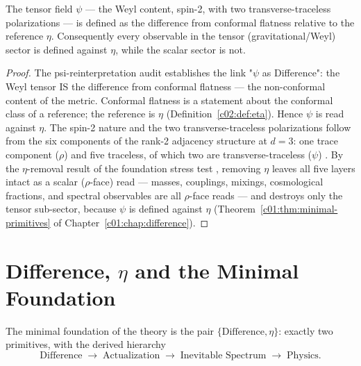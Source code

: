 \begin{theorem}
\label{c02:thm:tensor-read}
The tensor field $\psi$ --- the Weyl content, spin-2, with two transverse-traceless
polarizations --- is defined as the difference from conformal flatness relative to the
reference $\eta$. Consequently every observable in the tensor (gravitational/Weyl) sector is
defined against $\eta$, while the scalar sector is not.
\end{theorem}

\begin{proof}
The psi-reinterpretation audit \cite{c02:QG285} establishes the link "$\psi$ as Difference": the
Weyl tensor IS the difference from conformal flatness --- the non-conformal content of the
metric. Conformal flatness is a statement about the conformal class of a reference; the
reference is $\eta$ (Definition~\ref{c02:def:eta}). Hence $\psi$ is read against $\eta$. The
spin-2 nature and the two transverse-traceless polarizations follow from the six components
of the rank-2 adjacency structure at $d=3$: one trace component ($\rho$) and five traceless,
of which two are transverse-traceless ($\psi$) \cite{c02:QG286}. By the $\eta$-removal result
of the foundation stress test \cite{c02:QG292}, removing $\eta$ leaves all five layers intact
as a scalar ($\rho$-face) read --- masses, couplings, mixings, cosmological fractions, and
spectral observables are all $\rho$-face reads --- and destroys only the tensor sub-sector,
because $\psi$ is defined against $\eta$ (Theorem~\ref{c01:thm:minimal-primitives} of
Chapter~\ref{c01:chap:difference}).
\end{proof}

\section{Difference, \texorpdfstring{$\eta$}{eta} and the Minimal Foundation}
\label{c02:sec:minimal-foundation}

\begin{theorem}
\label{c02:thm:minimal-foundation}
The minimal foundation of the theory is the pair $\{\text{Difference},\eta\}$: exactly two
primitives, with the derived hierarchy
\begin{equation}
\label{c02:eq:core}
\text{Difference}\;\longrightarrow\;\text{Actualization}\;\longrightarrow\;\text{Inevitable Spectrum}\;\longrightarrow\;\text{Physics}.
\end{equation}
\end{theorem}

